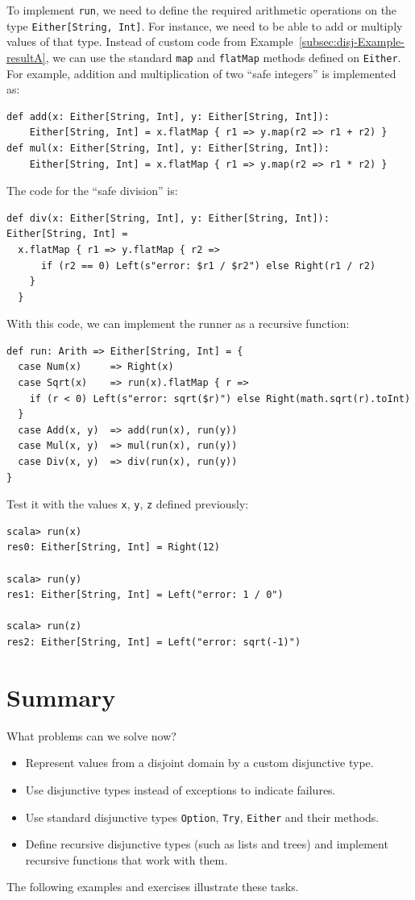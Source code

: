 To implement \lstinline!run!, we need to define the required arithmetic
operations on the type \lstinline!Either[String, Int]!. For instance,
we need to be able to add or multiply values of that type. Instead
of custom code from Example~\ref{subsec:disj-Example-resultA}, we
can use the standard \lstinline!map! and \lstinline!flatMap! methods
defined on \lstinline!Either!. For example, addition and multiplication
of two \textsf{``}safe integers\textsf{''} is implemented as:
\begin{lstlisting}
def add(x: Either[String, Int], y: Either[String, Int]):
    Either[String, Int] = x.flatMap { r1 => y.map(r2 => r1 + r2) }
def mul(x: Either[String, Int], y: Either[String, Int]):
    Either[String, Int] = x.flatMap { r1 => y.map(r2 => r1 * r2) }
\end{lstlisting}
The code for the \textsf{``}safe division\textsf{''} is:
\begin{lstlisting}
def div(x: Either[String, Int], y: Either[String, Int]): Either[String, Int] =
  x.flatMap { r1 => y.flatMap { r2 =>
      if (r2 == 0) Left(s"error: $r1 / $r2") else Right(r1 / r2)
    }
  }
\end{lstlisting}
With this code, we can implement the runner as a recursive function:
\begin{lstlisting}
def run: Arith => Either[String, Int] = {
  case Num(x)     => Right(x)
  case Sqrt(x)    => run(x).flatMap { r =>
    if (r < 0) Left(s"error: sqrt($r)") else Right(math.sqrt(r).toInt)
  }
  case Add(x, y)  => add(run(x), run(y))
  case Mul(x, y)  => mul(run(x), run(y))
  case Div(x, y)  => div(run(x), run(y))
}
\end{lstlisting}
Test it with the values \lstinline!x!, \lstinline!y!, \lstinline!z!
defined previously:
\begin{lstlisting}
scala> run(x)
res0: Either[String, Int] = Right(12)

scala> run(y)
res1: Either[String, Int] = Left("error: 1 / 0")

scala> run(z)
res2: Either[String, Int] = Left("error: sqrt(-1)")
\end{lstlisting}


\section{Summary}

What problems can we solve now?
\begin{itemize}
\item Represent values from a disjoint domain by a custom disjunctive type.
\item Use disjunctive types instead of exceptions to indicate failures.
\item Use standard disjunctive types \lstinline!Option!, \lstinline!Try!,
\lstinline!Either! and their methods.
\item Define recursive disjunctive types (such as lists and trees) and implement
recursive functions that work with them.
\end{itemize}
The following examples and exercises illustrate these tasks.

